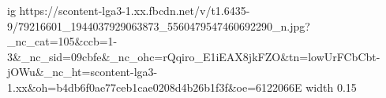  
 
 
 
 

\par
\ifcmt
  ig https://scontent-lga3-1.xx.fbcdn.net/v/t1.6435-9/79216601_1944037929063873_5560479547460692290_n.jpg?_nc_cat=105&ccb=1-3&_nc_sid=09cbfe&_nc_ohc=rQqiro_E1iEAX8jkFZO&tn=lowUrFCbCbt-jOWu&_nc_ht=scontent-lga3-1.xx&oh=b4db6f0ae77ceb1cae0208d4b26b1f3f&oe=6122066E
  width 0.15
\fi
